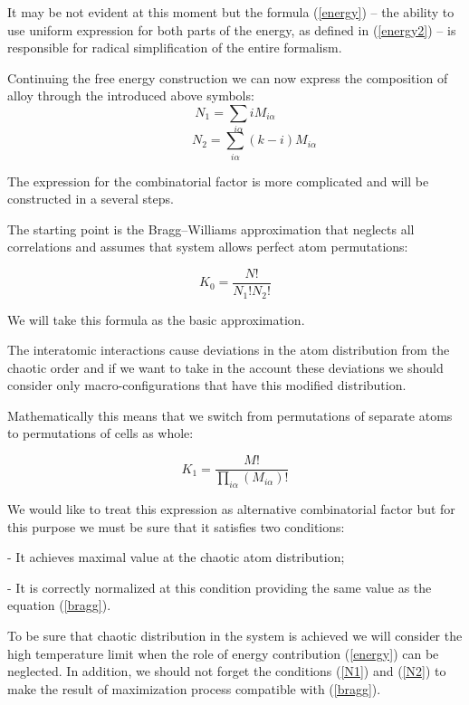 \documentclass[12pt,abstract]{scrartcl}
\begin{document}
It may be not evident at this moment but  the formula (\ref{energy}) -- the ability to use uniform expression for both parts of the energy, as defined in (\ref{energy2}) -- is responsible for radical simplification of the entire formalism. 


Continuing the   free energy construction we can now express the composition of alloy  through the introduced above  symbols:
\begin{equation} \label{N1}
    N_1 = \sum_{i\alpha} i M_{i \alpha}
\end{equation}
\begin{equation} \label{N2}
  \quad  \quad   \quad   N_2 = \sum_{i\alpha} (k-i) M_{i \alpha}
\end{equation}


The expression for the combinatorial factor \cite{Hill1956} is more complicated and will be constructed in a several steps. 


The starting point is the Bragg--Williams approximation \cite{Hill1956} that neglects all correlations and assumes that system allows perfect atom permutations:

\begin{equation} \label{bragg}
K_0 = \frac{N!}{N_1! N_2!}
\end{equation}

We will take this formula as the basic approximation.

The interatomic interactions  cause deviations in the atom distribution from the chaotic order and if we want to take in the account these deviations we should consider only macro-configurations that have this modified distribution.

 Mathematically this means that we switch from permutations of separate atoms to permutations of cells as whole: 


\begin{equation} \label{K1}
K_1 = \frac{M!}{\prod\limits_{i \alpha} ( M_{i \alpha})!}
\end{equation}

We would like to treat this expression as alternative   combinatorial  factor but for this purpose we  must be sure that it satisfies two conditions:

    - It achieves maximal value at the chaotic atom distribution;

    - It is correctly normalized at this condition providing the same value as  the equation (\ref{bragg}).


To be sure that chaotic distribution in the system is achieved we will consider the high temperature limit when the role of energy contribution (\ref{energy}) can be neglected. In addition, we should not forget the conditions (\ref{N1}) and (\ref{N2}) to make the result of maximization process compatible with (\ref{bragg}).
\end{document}
